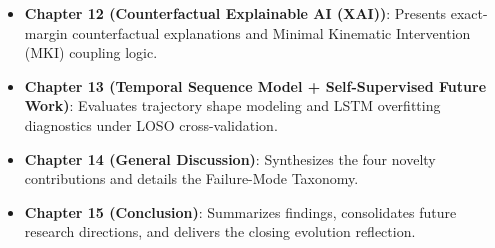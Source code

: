 \begin{itemize}
  \item \textbf{Chapter 12 (Counterfactual Explainable AI (XAI))}: Presents exact-margin counterfactual explanations and Minimal Kinematic Intervention (MKI) coupling logic.
  \item \textbf{Chapter 13 (Temporal Sequence Model + Self-Supervised Future Work)}: Evaluates trajectory shape modeling and LSTM overfitting diagnostics under LOSO cross-validation.
  \item \textbf{Chapter 14 (General Discussion)}: Synthesizes the four novelty contributions and details the Failure-Mode Taxonomy.
  \item \textbf{Chapter 15 (Conclusion)}: Summarizes findings, consolidates future research directions, and delivers the closing evolution reflection.
\end{itemize}